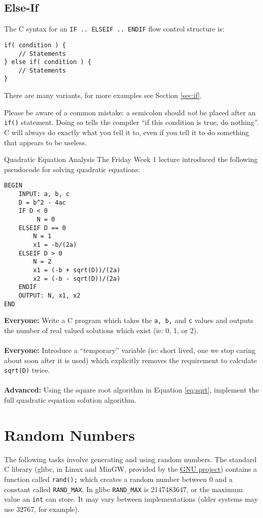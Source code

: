 \documentclass{lab}
\begin{document}
\pagebreak
\subsection{Else-If}

The C syntax for an \texttt{IF .. ELSEIF .. ENDIF} flow control structure is:

\begin{lstlisting}[style=CStyle]
if( condition ) {
	// Statements
} else if( condition ) {
	// Statements
}
\end{lstlisting}

There are many variants, for more examples see Section \ref{sec:if}.

Please be aware of a common mistake: a semicolon should \textit{not} be placed after an \texttt{if()} statement. Doing so tells the compiler ``if this condition is true, do nothing''. C will always do exactly what you tell it to, even if you tell it to do something that appears to be useless.

\begin{task}{Quadratic Equation Analysis}{}
The Friday Week 1 lecture introduced the following pseudocode for solving quadratic equations:
\begin{lstlisting}[style=pseudo]
BEGIN
	INPUT: a, b, c
	D = b^2 - 4ac
	IF D < 0
		 N = 0
	ELSEIF D == 0
		N = 1
		x1 = -b/(2a)
	ELSEIF D > 0
		N = 2
		x1 = (-b + sqrt(D))/(2a)
		x2 = (-b - sqrt(D))/(2a)
	ENDIF
	OUTPUT: N, x1, x2
END
\end{lstlisting}

\textbf{Everyone:} Write a C program which takes the \texttt{a, b,} and \texttt{c} values and outputs the number of real valued solutions which exist (ie: 0, 1, or 2).
\\ \\
\textbf{Everyone:} Introduce a ``temporary'' variable (ie: short lived, one we stop caring about soon after it is used) which explicitly removes the requirement to calculate \texttt{sqrt(D)} twice.
\\ \\
\textbf{Advanced:} Using the square root algorithm in Equation \ref{eq:sqrt}, implement the full quadratic equation solution algorithm.
\end{task}

\pagebreak
\section{Random Numbers}

The following tasks involve generating and using random numbers. The standard C library (glibc, in Linux and MinGW, provided by the \underline{\href{https://en.wikipedia.org/wiki/GNU_Project}{GNU project}}) contains a function called \texttt{rand();} which creates a random number between 0 and a constant called \texttt{RAND\_MAX}. In glibc \texttt{RAND\_MAX} is 2147483647, or the maximum value an \texttt{int} can store. It may vary between implementations (older systems may use 32767, for example).
\end{document}
